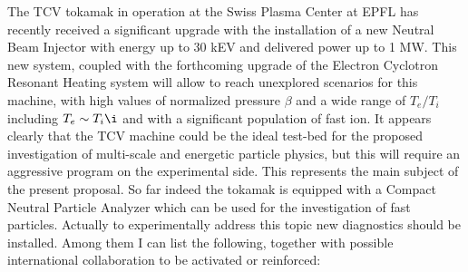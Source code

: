 \documentclass[12pt,a4paper]{article}
\begin{document}
The TCV tokamak in operation at the Swiss Plasma Center at EPFL has 
recently received a significant upgrade with the installation of a new Neutral Beam
Injector with energy up to 30 kEV and delivered power up to 1 MW. This
new system, coupled with the forthcoming upgrade of the Electron
Cyclotron Resonant Heating system will allow to reach unexplored
scenarios for this machine, with high values of normalized pressure $\beta$ and a wide range of
$T_e/T_i$ including $T_e\sim T_i\i$ and with a significant population
of fast ion. It appears clearly that the TCV machine could be the
ideal test-bed for the proposed investigation of multi-scale and
energetic particle physics, but this will require an aggressive
program on the 
experimental side. This represents the main subject of the present proposal. 
So far indeed the tokamak is equipped with a
Compact Neutral Particle Analyzer which can be used for the
investigation of fast particles. Actually to experimentally address
this topic new diagnostics should be installed. Among them I can list the
following, together with possible international collaboration to be activated or reinforced:
\end{document}
